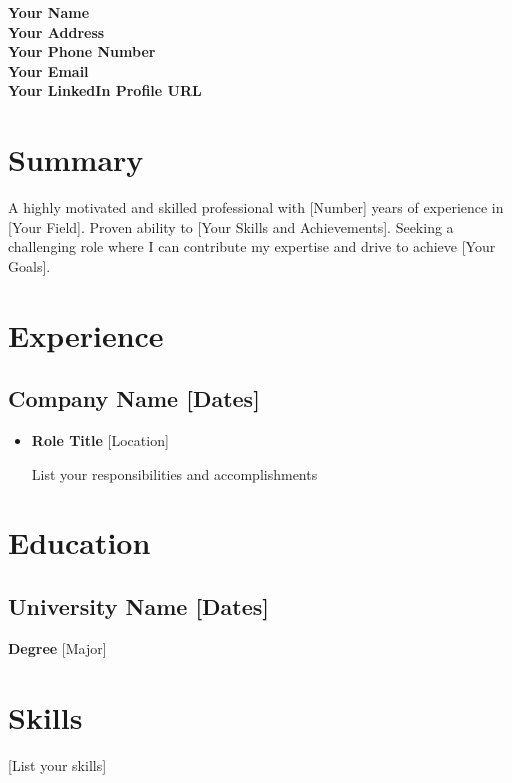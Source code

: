 \documentclass[11pt,letterpaper]{article}
\begin{document}
\begin{center}
\Huge{\bfseries Your Name}\\
\large{\bfseries Your Address}\\
\large{\bfseries Your Phone Number}\\
\large{\bfseries Your Email}\\
\large{\bfseries Your LinkedIn Profile URL}\\
\end{center}
\vspace{1cm}
\section{Summary}
A highly motivated and skilled professional with [Number] years of experience in [Your Field]. Proven ability to [Your Skills and Achievements]. Seeking a challenging role where I can contribute my expertise and drive to achieve [Your Goals].
\vspace{1cm}
\section{Experience}
\subsection{Company Name \hfill [Dates]}
\begin{itemize}[noitemsep,topsep=0pt]
\item {\bfseries Role Title} \hfill [Location]
\item [List your responsibilities and accomplishments]
\end{itemize}
\vspace{1cm}
\section{Education}
\subsection{University Name \hfill [Dates]}
{\bfseries Degree} \hfill [Major]
\vspace{1cm}
\section{Skills}
[List your skills]
\end{document}
